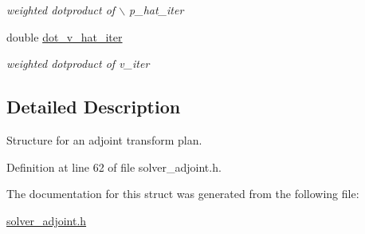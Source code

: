 \begin{CompactItemize}
\begin{CompactList}\small\item\em weighted dotproduct of $\backslash$ p\_\-hat\_\-iter \item\end{CompactList}\item 
\hypertarget{structinfft__adjoint__plan_o17}{
double \hyperlink{structinfft__adjoint__plan_o17}{dot\_\-v\_\-hat\_\-iter}}
\label{structinfft__adjoint__plan_o17}

\begin{CompactList}\small\item\em weighted dotproduct of v\_\-iter \item\end{CompactList}\end{CompactItemize}


\subsection{Detailed Description}
Structure for an adjoint transform plan. 



Definition at line 62 of file solver\_\-adjoint.h.

The documentation for this struct was generated from the following file:\begin{CompactItemize}
\item 
\hyperlink{solver__adjoint_8h}{solver\_\-adjoint.h}\end{CompactItemize}

